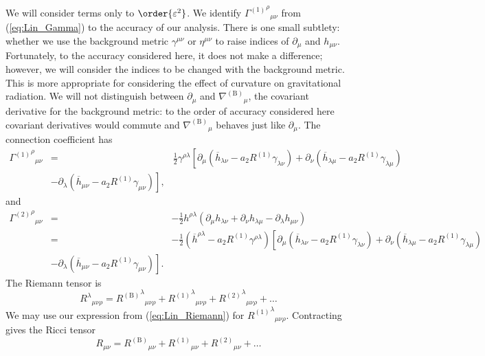 \documentclass[aps,prd,reprint,showpacs]{revtex4-1}
\newcommand{\eqnref}[1]{(\ref{eq:#1})}
\begin{document}
We will consider terms only to $\order{\varepsilon^2}$. We identify ${{\Gamma^{(1)}}^\rho}_{\mu\nu}$ from \eqnref{Lin_Gamma} to the accuracy of our analysis. There is one small subtlety: whether we use the background metric $\gamma^{\mu\nu}$ or $\eta^{\mu\nu}$ to raise indices of $\partial_\mu$ and $h_{\mu\nu}$. Fortunately, to the accuracy considered here, it does not make a difference; however, we will consider the indices to be changed with the background metric. This is more appropriate for considering the effect of curvature on gravitational radiation. We will not distinguish between $\partial_\mu$ and ${\nabla^{(\text{B})}}_\mu$, the covariant derivative for the background metric: to the order of accuracy considered here covariant derivatives would commute and ${\nabla^{(\text{B})}}_\mu$ behaves just like $\partial_\mu$. The connection coefficient has
\begin{eqnarray}
{{\Gamma^{(1)}}^\rho}_{\mu\nu} & = & \frac{1}{2}\gamma^{\rho\lambda}\left[\partial_\mu \left(\overline{h}_{\lambda\nu} - a_2 R^{(1)}\gamma_{\lambda\nu}\right) + \partial_\nu \left(\overline{h}_{\lambda\mu} - a_2 R^{(1)}\gamma_{\lambda\mu}\right) \right. \nonumber \\
  & - \left. \partial_\lambda \left(\overline{h}_{\mu\nu} - a_2 R^{(1)}\gamma_{\mu\nu}\right)\right],
\end{eqnarray}
and
\begin{eqnarray}
{{\Gamma^{(2)}}^\rho}_{\mu\nu} & = & -\frac{1}{2}h^{\rho\lambda}(\partial_\mu h_{\lambda\nu} + \partial_\nu h_{\lambda\mu} - \partial_\lambda h_{\mu\nu}) \nonumber \\
 & = & -\frac{1}{2}\left(\overline{h}^{\rho\lambda} - a_2 R^{(1)}\gamma^{\rho\lambda}\right)\left[\partial_\mu \left(\overline{h}_{\lambda\nu} - a_2 R^{(1)}\gamma_{\lambda\nu}\right) + \partial_\nu \left(\overline{h}_{\lambda\mu} - a_2 R^{(1)}\gamma_{\lambda\mu}\right) \right. \nonumber \\
 & - \left. \partial_\lambda \left(\overline{h}_{\mu\nu} - a_2 R^{(1)}\gamma_{\mu\nu}\right)\right].
\end{eqnarray}
The Riemann tensor is
\begin{equation}
{R^\lambda}_{\mu\nu\rho} = {{R^{(\text{B})}}^\lambda}_{\mu\nu\rho} + {{R^{(1)}}^\lambda}_{\mu\nu\rho} + {{R^{(2)}}^\lambda}_{\mu\nu\rho} + \ldots
\end{equation}
We may use our expression from \eqnref{Lin_Riemann} for ${{R^{(1)}}^\lambda}_{\mu\nu\rho}$. Contracting gives the Ricci tensor
\begin{equation}
{R}_{\mu\nu} = {R^{(\text{B})}}_{\mu\nu} + {R^{(1)}}_{\mu\nu} + {R^{(2)}}_{\mu\nu} + \ldots
\end{equation}
\end{document}
